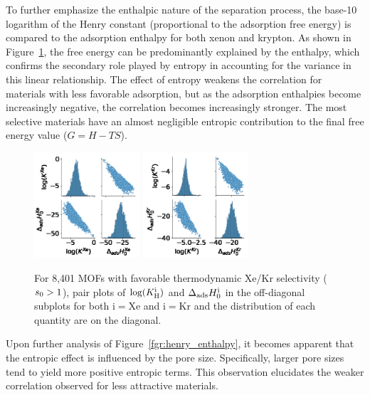 \documentclass[main.tex]{subfiles}
\begin{document}
To further emphasize the enthalpic nature of the separation process, the base-10 logarithm of the Henry constant (proportional to the adsorption free energy) is compared to the adsorption enthalpy for both xenon and krypton. As shown in Figure~\ref{fgr:SI:HK}, the free energy can be predominantly explained by the enthalpy, which confirms the secondary role played by entropy in accounting for the variance in this linear relationship. The effect of entropy weakens the correlation for materials with less favorable adsorption, but as the adsorption enthalpies become increasingly negative, the correlation becomes increasingly stronger. The most selective materials have an almost negligible entropic contribution to the final free energy value ($G=H-TS$).

\begin{figure}[ht]
  \centering
    \includegraphics[width=0.35\textwidth]{figures/2-thermo/H_K_Xe.jpg}
    \includegraphics[width=0.35\textwidth]{figures/2-thermo/H_K_Kr.jpg}
    \caption{For 8,401 MOFs with favorable thermodynamic Xe/Kr selectivity ($s_{\text{0}} > 1$), pair plots of $\log(K_{\text{H}}^{\text{i}})$ and $\Delta_{\text{ads}}H^{\text{i}}_{\text{0}}$ in the off-diagonal subplots for both i$=$Xe and i$=$Kr and the distribution of each quantity are on the diagonal.}\label{fgr:SI:HK}
\end{figure}

Upon further analysis of Figure~\ref{fgr:henry_enthalpy}, it becomes apparent that the entropic effect is influenced by the pore size. Specifically, larger pore sizes tend to yield more positive entropic terms. This observation elucidates the weaker correlation observed for less attractive materials.
\end{document}
